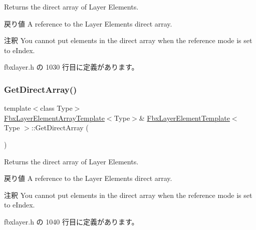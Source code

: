 Returns the direct array of Layer Elements. \begin{DoxyReturn}{戻り値}
A reference to the Layer Elements direct array. 
\end{DoxyReturn}
\begin{DoxyRemark}{注釈}
You cannot put elements in the direct array when the reference mode is set to e\+Index. 
\end{DoxyRemark}


 fbxlayer.\+h の 1030 行目に定義があります。

\mbox{\label{class_fbx_layer_element_template_ad34f79d4abaa1d101cc756048a5f11b9}} 
\subsubsection{\texorpdfstring{Get\+Direct\+Array()}{GetDirectArray()}\hspace{0.1cm}{\footnotesize\ttfamily [2/2]}}
{\footnotesize\ttfamily template$<$class Type$>$ \\
\hyperlink{class_fbx_layer_element_array_template}{Fbx\+Layer\+Element\+Array\+Template}$<$Type$>$\& \hyperlink{class_fbx_layer_element_template}{Fbx\+Layer\+Element\+Template}$<$ Type $>$\+::Get\+Direct\+Array (\begin{DoxyParamCaption}{ }\end{DoxyParamCaption})\hspace{0.3cm}{\ttfamily [inline]}}

Returns the direct array of Layer Elements. \begin{DoxyReturn}{戻り値}
A reference to the Layer Elements direct array. 
\end{DoxyReturn}
\begin{DoxyRemark}{注釈}
You cannot put elements in the direct array when the reference mode is set to e\+Index. 
\end{DoxyRemark}


 fbxlayer.\+h の 1040 行目に定義があります。

\mbox{\label{class_fbx_layer_element_template_ab1494495d1944eb4b20c4c97abd6358c}} 
